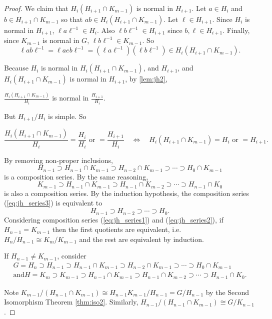 \begin{proof}
	We claim that $H_i(H_{i+1}\cap K_{m-1})$ is normal in $H_{i+1}$. Let $a\in H_i$ and $b\in H_{i+1}\cap K_{m-1}$ so that $ab\in H_i(H_{i+1}\cap K_{m-1})$. Let $\ell\in H_{i+1}$. Since $H_i$ is normal in $H_{i+1}$, $\ell a\ell^{-1}\in H_i$. Also $\ell b\ell^{-1}\in H_{i+1}$ since $b,\ell\in H_{i+1}$. Finally, since $K_{m-1}$ is normal in $G$, $\ell b\ell^{-1}\in K_{m-1}$. So
	$$\ell ab\ell^{-1}=\ell aeb\ell^{-1}=(\ell a\ell^{-1})(\ell b\ell^{-1})\in H_i(H_{i+1}\cap K_{m-1}).$$

	Because $H_i$ is normal in $H_i(H_{i+1}\cap K_{m-1})$, and $H_{i+1}$, and $H_i(H_{i+1}\cap K_{m-1})$ is normal in $H_{i+1}$, by \ref{lem:jh2},

	{\centering $\frac{H_i(H_{i+1}\cap K_{m-1})}{H_i}$ is normal in $\frac{H_{i+1}}{H_i}$.\par}

	But $H_{i+1}/H_i$ is simple. So

	$$\frac{H_i(H_{i+1}\cap K_{m-1})}{H_i}=\frac{H_i}{H_i}\text{ or }=\frac{H_{i+1}}{H_i}\quad\Longleftrightarrow\quad H_i(H_{i+1}\cap K_{m-1})=H_i\text{ or }=H_{i+1}.$$

	By removing non-proper inclusions,
	\begin{equation}\label{eq:jh_series3}
		H_{n-1}\supset H_{n-1}\cap K_{m-1}\supset H_{n-2}\cap K_{m-1}\supset\cdots\supset H_0\cap K_{m-1}
	\end{equation}
	is a composition series. By the same reasoning,
	\begin{equation}\label{eq:jh_series4}
		K_{m-1}\supset H_{n-1}\cap K_{m-1}\supset H_{n-1}\cap K_{m-2}\supset\cdots\supset H_{n-1}\cap K_0
	\end{equation}
	is also a composition series. By the induction hypothesis, the composition series (\ref{eq:jh_series3}) is equivalent to
	$$H_{n-1}\supset H_{n-2}\supset\cdots\supset H_0.$$
	Considering composition series (\ref{eq:jh_series1}) and (\ref{eq:jh_series2}), if $H_{n-1}=K_{m-1}$ then the first quotients are equivalent, i.e. $H_n/H_{n-1}\cong K_m/K_{m-1}$ and the rest are equivalent by induction.

	If $H_{n-1}\neq K_{m-1}$, consider
	\begin{gather}
		G=H_n\supset H_{n-1}\supset H_{n-1}\cap K_{m-1}\supset H_{n-2}\cap K_{m-1}\supset\cdots\supset H_0\cap K_{m-1}\\
		\text{and}
		H=K_m\supset K_{m-1}\supset H_{n-1}\cap K_{m-1}\supset H_{n-1}\cap K_{m-2}\supset\cdots\supset H_{n-1}\cap K_0.
	\end{gather}

	Note $K_{m-1}/(H_{n-1}\cap K_{m-1})\cong H_{n-1}K_{m-1}/H_{n-1}=G/H_{n-1}$ by the Second Isomorphism Theorem \ref{thm:iso2}. Similarly, $H_{n-1}/(H_{n-1}\cap K_{m-1})\cong G/K_{n-1}$.
\end{proof}

